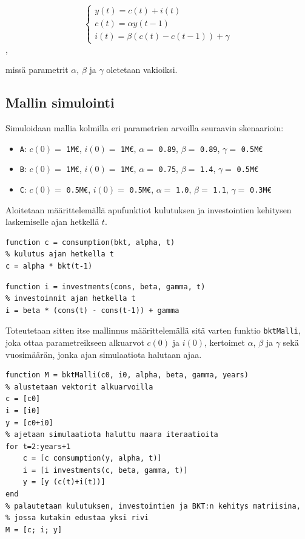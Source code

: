 \documentclass[a4paper,11pt]{article}
\begin{document}
{\begin{equation}
    \begin{cases}
    y(t) = c(t) + i(t) \\
    c(t) = \alpha y(t-1) \\
    i(t) = \beta (c(t)-c(t-1)) + \gamma
    \end{cases}
\end{equation},

missä parametrit $\alpha$, $\beta$ ja $\gamma$ oletetaan vakioiksi.

\subsection{Mallin simulointi}

Simuloidaan mallia kolmilla eri parametrien arvoilla seuraavin skenaarioin:

\begin{itemize}
    \item \texttt{A}: $c(0) =$ \texttt{1M€}, $i(0) =$ \texttt{1M€}, $\alpha =$ \texttt{0.89}, $\beta =$ \texttt{0.89}, $\gamma =$ \texttt{0.5M€}
    \item \texttt{B}: $c(0) =$ \texttt{1M€}, $i(0) =$ \texttt{1M€}, $\alpha =$ \texttt{0.75}, $\beta =$ \texttt{1.4}, $\gamma =$ \texttt{0.5M€}
    \item \texttt{C}: $c(0) =$ \texttt{0.5M€}, $i(0) =$ \texttt{0.5M€}, $\alpha =$ \texttt{1.0}, $\beta =$ \texttt{1.1}, $\gamma =$ \texttt{0.3M€}
\end{itemize}

Aloitetaan määrittelemällä apufunktiot kulutuksen ja investointien kehitysen laskemiselle ajan hetkellä $t$.

\begin{lstlisting}
function c = consumption(bkt, alpha, t)
% kulutus ajan hetkella t
c = alpha * bkt(t-1)
\end{lstlisting}

\begin{lstlisting}
function i = investments(cons, beta, gamma, t)
% investoinnit ajan hetkella t
i = beta * (cons(t) - cons(t-1)) + gamma
\end{lstlisting}

Toteutetaan sitten itse mallinnus määrittelemällä sitä varten funktio \texttt{bktMalli}, joka  ottaa parametreikseen alkuarvot $c(0)$ ja $i(0)$, kertoimet $\alpha$, $\beta$ ja $\gamma$ sekä vuosimäärän, jonka ajan simulaatiota halutaan ajaa.

\begin{lstlisting}
function M = bktMalli(c0, i0, alpha, beta, gamma, years)
% alustetaan vektorit alkuarvoilla
c = [c0]
i = [i0]
y = [c0+i0]
% ajetaan simulaatiota haluttu maara iteraatioita
for t=2:years+1
    c = [c consumption(y, alpha, t)]
    i = [i investments(c, beta, gamma, t)]
    y = [y (c(t)+i(t))]
end
% palautetaan kulutuksen, investointien ja BKT:n kehitys matriisina,
% jossa kutakin edustaa yksi rivi
M = [c; i; y]
\end{lstlisting}

}
\end{document}
